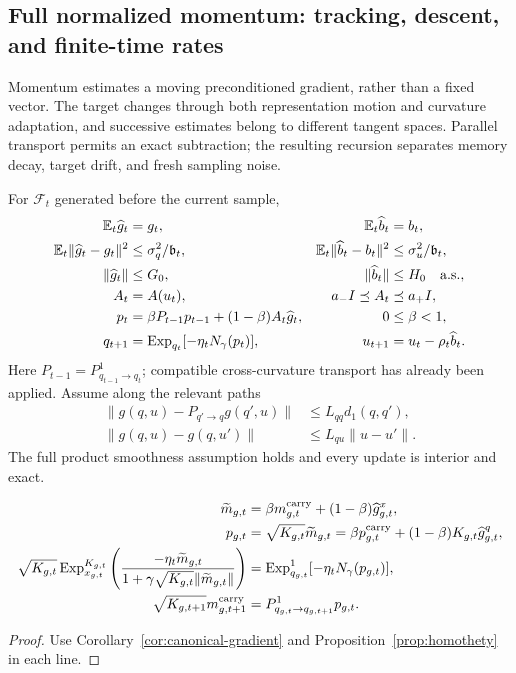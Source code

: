 \subsection{Full normalized momentum: tracking, descent, and finite-time rates}
\label{app:rigid-momentum}
Momentum estimates a moving preconditioned gradient, rather than a fixed vector. The target changes through both representation motion and curvature adaptation, and successive estimates belong to different tangent spaces. Parallel transport permits an exact subtraction; the resulting recursion separates memory decay, target drift, and fresh sampling noise.
\begin{assumption}
\label{ass:rigid-full-momentum}
For $\mathcal F_t$ generated before the current sample,
\begin{align}
 \mathbb E_t\widehat g_t&=g_t,&
 \mathbb E_t\widehat b_t&=b_t,\\
 \mathbb E_t\|\widehat g_t-g_t\|^2&\le\sigma_q^2/\mathfrak b_t,&
 \mathbb E_t\|\widehat b_t-b_t\|^2&\le\sigma_u^2/\mathfrak b_t,\\
 \|\widehat g_t\|&\le G_0,&\|\widehat b_t\|&\le H_0\quad\text{a.s.},\\
 A_t&=A(u_t),&a_-I\preceq A_t&\preceq a_+I,\\
 p_t&=\beta P_{t-1}p_{t-1}+(1-\beta)A_t\widehat g_t,&0&\le\beta<1,\\
 q_{t+1}&=\operatorname{Exp}_{q_t}[-\eta_tN_\gamma(p_t)],&
 u_{t+1}&=u_t-\rho_t\widehat b_t.\label{eq:rigid-full-update}
\end{align}
Here $P_{t-1}=P^1_{q_{t-1}\to q_t}$; compatible cross-curvature transport has already been applied.
Assume along the relevant paths
\begin{align}
 \|g(q,u)-P_{q'\to q}g(q',u)\|&\le L_{qq}d_1(q,q'),\\
 \|g(q,u)-g(q,u')\|&\le L_{qu}\|u-u'\|.
\end{align}
The full product smoothness assumption holds and every update is interior and exact.
\end{assumption}

\begin{proposition}
\begin{align}
 \widetilde m_{g,t}&=\beta m_{g,t}^{\rm carry}+(1-\beta)\widehat g^x_{g,t},\\
 p_{g,t}&=\sqrt{K_{g,t}}\widetilde m_{g,t}
 =\beta p_{g,t}^{\rm carry}+(1-\beta)K_{g,t}\widehat g^q_{g,t},\\
 \sqrt{K_{g,t}}\operatorname{Exp}_{x_{g,t}}^{K_{g,t}}
 \left(\frac{-\eta_t\widetilde m_{g,t}}{1+\gamma\sqrt{K_{g,t}}\|\widetilde m_{g,t}\|}\right)
 &=\operatorname{Exp}_{q_{g,t}}^1[-\eta_tN_\gamma(p_{g,t})],\\
 \sqrt{K_{g,t+1}}m_{g,t+1}^{\rm carry}
 &=P^1_{q_{g,t}\to q_{g,t+1}}p_{g,t}.
\end{align}
\end{proposition}
\begin{proof}
Use Corollary~\ref{cor:canonical-gradient} and Proposition~\ref{prop:homothety} in each line.
\end{proof}

